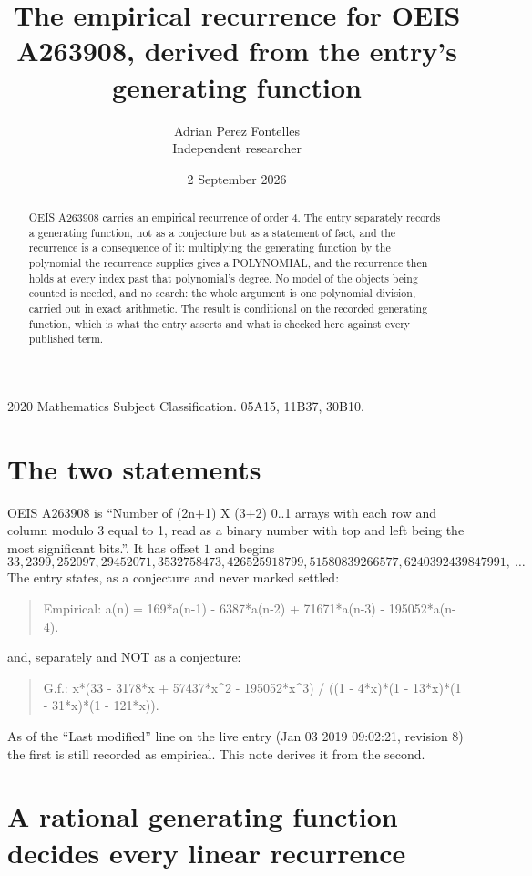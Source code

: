 \documentclass[11pt,a4paper]{article}
\title{The empirical recurrence for OEIS A263908, derived from the entry's generating function}
\author{Adrian Perez Fontelles\\ \small Independent researcher}
\date{2 September 2026}
\theoremstyle{plain}
\theoremstyle{definition}
\begin{document}
\maketitle

\begin{abstract}
OEIS A263908 carries an empirical recurrence of order $4$. The entry separately records a
generating function, not as a conjecture but as a statement of fact, and the recurrence is a
consequence of it: multiplying the generating function by the polynomial the recurrence
supplies gives a POLYNOMIAL, and the recurrence then holds at every index past that
polynomial's degree. No model of the objects being counted is needed, and no search: the
whole argument is one polynomial division, carried out in exact arithmetic. The result is
conditional on the recorded generating function, which is what the entry asserts and what is
checked here against every published term.
\end{abstract}

\noindent\small 2020 Mathematics Subject Classification. 05A15, 11B37, 30B10.\normalsize

\section{The two statements}

OEIS A263908 is ``Number of (2n+1) X (3+2) 0..1 arrays with each row and column modulo 3 equal to 1, read as a binary number with top and left being the most significant bits.''. It has offset $1$ and begins
\[
33, 2399, 252097, 29452071, 3532758473, 426525918799, 51580839266577, 6240392439847991,\ \dots
\]
The entry states, as a conjecture and never marked settled:
\begin{quote}
Empirical: a(n) = 169*a(n-1) - 6387*a(n-2) + 71671*a(n-3) - 195052*a(n-4).
\end{quote}
and, separately and NOT as a conjecture:
\begin{quote}
G.f.: x*(33 - 3178*x + 57437*x\^{}2 - 195052*x\^{}3) / ((1 - 4*x)*(1 - 13*x)*(1 - 31*x)*(1 - 121*x)).
\end{quote}
As of the ``Last modified'' line on the live entry (Jan 03 2019 09:02:21, revision 8) the first is still
recorded as empirical. This note derives it from the second.

\section{A rational generating function decides every linear recurrence}
\end{document}
